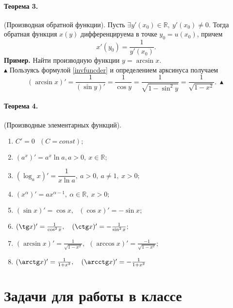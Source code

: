 \documentclass[a4paper,12pt]{article} %
\begin{document}
\paragraph{Теорема 3.} (Производная обратной функции).
Пусть $ \exists y'(x_0)\in\mathbb{R},~ y'(x_0)\ne0 $.
Тогда обратная функция $ x(y) $ дифференцируема в точке
$ y_0=u(x_0) $, причем
\begin{equation}\label{invfuncder}
	x'(y_0)=\dfrac{1}{y'(x_0)}.
\end{equation}
\textbf{Пример.} Найти производную функции $ y=\arcsin x $.\\
$ \blacktriangle $ Пользуясь формулой \eqref{invfuncder} и
определением арксинуса получаем
\[
	(\arcsin x)'=\dfrac{1}{(\sin y)'}=\dfrac{1}{\cos y}=
	\dfrac{1}{\sqrt{1-\sin^2y}}=\dfrac{1}{\sqrt{1-x^2}}. ~
	\blacktriangle
\]
\paragraph{Теорема 4.} (Производные элементарных функций).
\begin{multicols}{2}
	\begin{enumerate}\bfseries
		\item $ C'=0~~~(C=const); $
		\item $ (a^x)'=a^x\ln a, a>0,~ x\in\mathbb{R}; $
		\item $ (\log_a x)'=
		\dfrac{1}{x\ln a},~ a>0,~ a\ne1,~ x>0; $
		\item $ (x^\alpha)'=
		ax^{\alpha-1},~ \alpha\in\mathbb{R},~ x>0; $
		\item $ (\sin x)'=\cos x, ~~~ (\cos x)'=-\sin x; $
		\item $ (\tg x)'=
		\frac{1}{\cos^2x}, ~~~ (\ctg x)'=-\frac{1}{\sin^2x}; $
		\item $ (\arcsin x)'=\frac{1}{\sqrt{1-x^2}}, ~~
		(\arccos x)'=\frac{-1}{\sqrt{1-x^2}}; $
		\item $ (\arctg x)'=\frac{1}{1+x^2}, ~~~ 
		(\arcctg x)'=-\frac{1}{1+x^2} $
	\end{enumerate}
\end{multicols}
\section*{Задачи для работы в классе}
\end{document}
